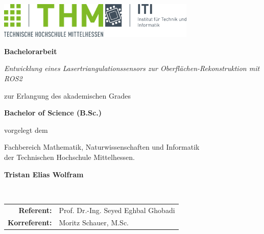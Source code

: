 \thispagestyle{empty}
\begin{center}
	\includegraphics[height=1.7cm]{img/thm-logo/thm1.png}
	\hfill
	\includegraphics[height=1.7cm]{img/iti-logo/iti_2020_whitespace.png}\\
	
	\vfill
	
	\Huge
	\textbf{Bachelorarbeit}\\ %
		
	\vfill
	
	\Huge
	\textit{Entwicklung eines Lasertriangulationssensors zur Oberflächen-Rekonstruktion mit ROS2}\\
	
	\vfill
	
	\large	
	zur Erlangung des akademischen Grades  \\
	
	\vfill
	
	\textbf{Bachelor of Science (B.Sc.)}\\ %
	
	\vfill
	
	vorgelegt dem  \\
	
	\vfill
	
	Fachbereich Mathematik, Naturwissenschaften und Informatik \\	
	der Technischen Hochschule Mittelhessen. \\
	
	\vfill
	
	\textbf{Tristan Elias Wolfram}\\
	
	\vfill
	
	\normalsize
	\\
	
	\vfill

	\begin{tabular}{rl}
		\rule{0mm}{2ex}\textbf{Referent:}    	& Prof. Dr.-Ing. Seyed Eghbal Ghobadi\\ 
		\rule{0mm}{2ex}\textbf{Korreferent:} 	& Moritz Schauer, M.Sc. \\ 
	\end{tabular} 
\end{center}